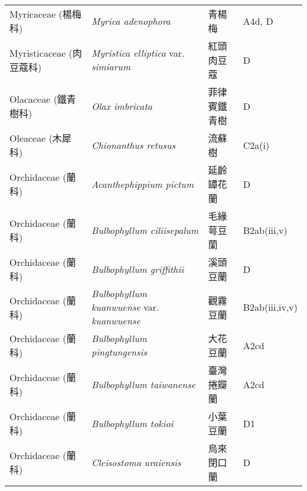 \begin{longtable}{p{3cm}p{5cm}p{3cm}p{4cm}}
    Myricaceae (楊梅科) & \textit{Myrica adenophora}  & 青楊梅 & A4d, D \index{Myrica@\textit{Myrica}!adenophora@\textit{adenophora}}  \index{青楊梅} \\
    Myristicaceae (肉豆蔻科) & \textit{Myristica elliptica} var. \textit{simiarum}  & 紅頭肉豆蔻 & D \index{Myristica@\textit{Myristica}!elliptica@\textit{elliptica}!var. simiarum@var. \textit{simiarum}}  \index{紅頭肉豆蔻} \\
    Olacaceae (鐵青樹科) & \textit{Olax imbricata}  & 菲律賓鐵青樹 & D \index{Olax@\textit{Olax}!imbricata@\textit{imbricata}}  \index{菲律賓鐵青樹} \\
    Oleaceae (木犀科) & \textit{Chionanthus retusus}  & 流蘇樹 & C2a(i) \index{Chionanthus@\textit{Chionanthus}!retusus@\textit{retusus}}  \index{流蘇樹} \\
    Orchidaceae (蘭科) & \textit{Acanthephippium pictum}  & 延齡罈花蘭 & D \index{Acanthephippium@\textit{Acanthephippium}!pictum@\textit{pictum}}  \index{延齡罈花蘭} \\
    Orchidaceae (蘭科) & \textit{Bulbophyllum ciliisepalum}  & 毛緣萼豆蘭 & B2ab(iii,v) \index{Bulbophyllum@\textit{Bulbophyllum}!ciliisepalum@\textit{ciliisepalum}}  \index{毛緣萼豆蘭} \\
    Orchidaceae (蘭科) & \textit{Bulbophyllum griffithii}  & 溪頭豆蘭 & D \index{Bulbophyllum@\textit{Bulbophyllum}!griffithii@\textit{griffithii}}  \index{溪頭豆蘭} \\
    Orchidaceae (蘭科) & \textit{Bulbophyllum kuanwuense} var. \textit{kuanwuense}  & 觀霧豆蘭 & B2ab(iii,iv,v) \index{Bulbophyllum@\textit{Bulbophyllum}!kuanwuense@\textit{kuanwuense}!var. kuanwuense@var. \textit{kuanwuense}}  \index{觀霧豆蘭} \\
    Orchidaceae (蘭科) & \textit{Bulbophyllum pingtungensis}  & 大花豆蘭 & A2cd \index{Bulbophyllum@\textit{Bulbophyllum}!pingtungensis@\textit{pingtungensis}}  \index{大花豆蘭} \\
    Orchidaceae (蘭科) & \textit{Bulbophyllum taiwanense}  & 臺灣捲瓣蘭 & A2cd \index{Bulbophyllum@\textit{Bulbophyllum}!taiwanense@\textit{taiwanense}}  \index{臺灣捲瓣蘭} \\
    Orchidaceae (蘭科) & \textit{Bulbophyllum tokioi}  & 小葉豆蘭 & D1 \index{Bulbophyllum@\textit{Bulbophyllum}!tokioi@\textit{tokioi}}  \index{小葉豆蘭} \\
    Orchidaceae (蘭科) & \textit{Cleisostoma uraiensis}  & 烏來閉口蘭 & D \index{Cleisostoma@\textit{Cleisostoma}!uraiensis@\textit{uraiensis}}  \index{烏來閉口蘭} \\

\end{longtable}
